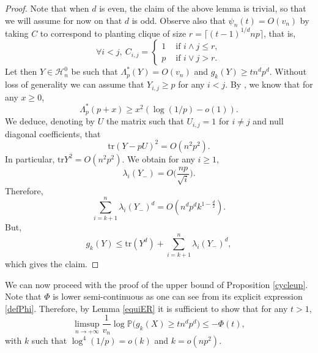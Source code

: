 \documentclass[aop,preprint]{imsart}
\newcommand\PP{\mathbb{P}}
\newcommand\tr{\mathrm{tr}}
\numberwithin{equation}{section}
\theoremstyle{definition}
\theoremstyle{plain}
\theoremstyle{remark}
\begin{document}
\begin{proof}Note that when $d$ is even, the claim of the above lemma is trivial, so that we will assume for now on that $d$ is odd. Observe also that $\psi_{n}(t) =O(v_n)$ by taking $C$ to correspond to planting clique of size $r=\lceil (t-1)^{1/d} np \rceil$, that is, 
$$\forall i<j, \ C_{i,j}= \begin{cases}1 & \text{ if } i\wedge j \leq r,\\
p & \text{ if } i\vee j >r.
\end{cases}$$
Let then $Y\in \mathcal{H}_n^0$ be such that $\Lambda^*_p(Y) =O(v_n)$ and $g_k(Y) \geq t n^d p^d$. Without loss of generality we can assume that $Y_{i,j}\geq p$ for any $i<j$. By \cite[Corollary 3.5]{LZ}, we know that for any $x\geq 0$,
$$ \Lambda^*_p(p+x) \geq x^2 (\log (1/p) - o(1)).$$
We deduce, denoting by $U$ the matrix such that $U_{i,j} = 1$ for $i\neq j$ and null diagonal coefficients, that
$$ \tr (Y-pU)^2 =O(n^2p^2).$$
In particular, $\tr Y^2 = O(n^2p^2)$. We obtain for any $i\geq 1$,
$$ \lambda_i(Y_-) =O\Big( \frac{np}{\sqrt{i}}\Big).$$
Therefore,
$$ \sum_{i=k+1}^n \lambda_i(Y_-)^d  = O(n^dp^d k^{1-\frac{d}{2}}).$$
But,
$$ g_k(Y) \leq  \tr (Y^d)  +\sum_{i=k+1}^n \lambda_i(Y_-)^d,$$
which gives the claim.
\end{proof}



We can now proceed with the proof of the upper bound of Proposition \ref{cycleup}. Note that $\Phi$ is lower semi-continuous as one can see from its explicit expression \eqref{defPhi}. Therefore, by Lemma \ref{equiER} it is sufficient to show that for any $t> 1$,
$$ \limsup_{n\to +\infty} \frac{1}{v_n} \log \PP\big ( g_k(X)  \geq t n^d p^d\big) \leq - \Phi(t),$$
with $k$ such that $ \log^4(1/p)= o(k)$ and $ k =o(np^2)$.
\end{document}
